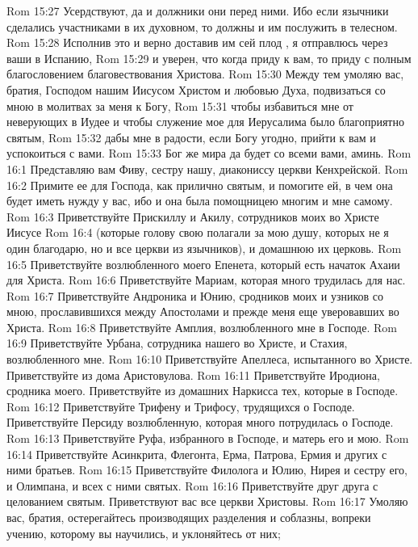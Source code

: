 \vs Rom 15:27 Усердствуют, да и должники они перед ними. Ибо если язычники сделались участниками в их духовном, то должны и им послужить в телесном.
\vs Rom 15:28 Исполнив это и верно доставив им сей плод , я отправлюсь через ваши  в Испанию,
\vs Rom 15:29 и уверен, что когда приду к вам, то приду с полным благословением благовествования Христова.
\rsbpar\vs Rom 15:30 Между тем умоляю вас, братия, Господом нашим Иисусом Христом и любовью Духа, подвизаться со мною в молитвах за меня к Богу,
\vs Rom 15:31 чтобы избавиться мне от неверующих в Иудее и чтобы служение мое для Иерусалима было благоприятно святым,
\vs Rom 15:32 дабы мне в радости, если Богу угодно, прийти к вам и успокоиться с вами.
\vs Rom 15:33 Бог же мира да будет со всеми вами, аминь.
\vs Rom 16:1 Представляю вам Фиву, сестру нашу, диакониссу церкви Кенхрейской.
\vs Rom 16:2 Примите ее для Господа, как прилично святым, и помогите ей, в чем она будет иметь нужду у вас, ибо и она была помощницею многим и мне самому.
\rsbpar\vs Rom 16:3 Приветствуйте Прискиллу и Акилу, сотрудников моих во Христе Иисусе
\vs Rom 16:4 (которые голову свою полагали за мою душу, которых не я один благодарю, но и все церкви из язычников), и домашнюю их церковь.
\vs Rom 16:5 Приветствуйте возлюбленного моего Епенета, который есть начаток Ахаии для Христа.
\vs Rom 16:6 Приветствуйте Мариам, которая много трудилась для нас.
\vs Rom 16:7 Приветствуйте Андроника и Юнию, сродников моих и узников со мною, прославившихся между Апостолами и прежде меня еще уверовавших во Христа.
\vs Rom 16:8 Приветствуйте Амплия, возлюбленного мне в Господе.
\vs Rom 16:9 Приветствуйте Урбана, сотрудника нашего во Христе, и Стахия, возлюбленного мне.
\vs Rom 16:10 Приветствуйте Апеллеса, испытанного во Христе. Приветствуйте  из дома Аристовулова.
\vs Rom 16:11 Приветствуйте Иродиона, сродника моего. Приветствуйте из домашних Наркисса тех, которые в Господе.
\vs Rom 16:12 Приветствуйте Трифену и Трифосу, трудящихся о Господе. Приветствуйте Персиду возлюбленную, которая много потрудилась о Господе.
\vs Rom 16:13 Приветствуйте Руфа, избранного в Господе, и матерь его и мою.
\vs Rom 16:14 Приветствуйте Асинкрита, Флегонта, Ерма, Патрова, Ермия и других с ними братьев.
\vs Rom 16:15 Приветствуйте Филолога и Юлию, Нирея и сестру его, и Олимпана, и всех с ними святых.
\vs Rom 16:16 Приветствуйте друг друга с целованием святым. Приветствуют вас все церкви Христовы.
\rsbpar\vs Rom 16:17 Умоляю вас, братия, остерегайтесь производящих разделения и соблазны, вопреки учению, которому вы научились, и уклоняйтесь от них;
